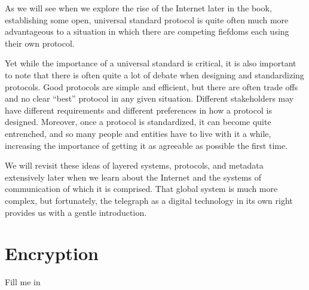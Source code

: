\documentclass{book}
\begin{document}
As we will see when we explore the rise of the Internet later in the book, establishing some open, universal standard protocol is quite often much more advantageous to a situation in which there are competing fiefdoms each using their own protocol.

Yet while the importance of a universal standard is critical, it is also important to note that there is often quite a lot of debate when designing and standardizing protocols. Good protocols are simple and efficient, but there are often trade offs and no clear ``best'' protocol in any given situation. Different stakeholders may have different requirements and different preferences in how a protocol is designed. Moreover, once a protocol is standardized, it can become quite entrenched, and so many people and entities have to live with it a while, increasing the importance of getting it as agreeable as possible the first time.

We will revisit these ideas of layered systems, protocols, and metadata extensively later when we learn about the Internet and the systems of communication of which it is comprised. That global system is much more complex, but fortunately, the telegraph as a digital technology in its own right provides us with a gentle introduction.

\section{Encryption}

Fill me in
\end{document}
